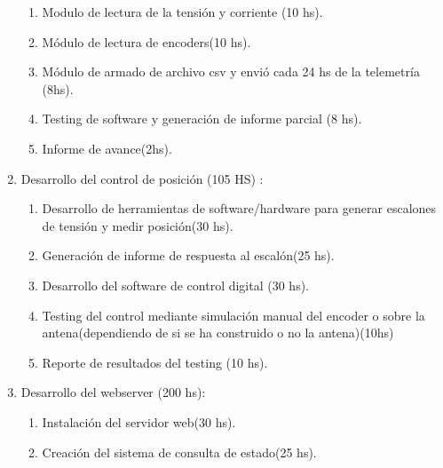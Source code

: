 \documentclass[11pt, %
codirector, %
]{charter}
\begin{document}
\begin{enumerate}
\begin{enumerate}
	\item Modulo de lectura de la tensión y corriente (10 hs). 
	\item Módulo de lectura de encoders(10 hs). 
	\item Módulo de armado de archivo csv y envió cada 24 hs de la telemetría (8hs).
	\item Testing de software y generación de informe parcial (8 hs). 
	\item Informe de avance(2hs). 		
	\end{enumerate}
\item Desarrollo del control de posición (105 HS) :  
	\begin{enumerate}
	\item  Desarrollo de herramientas de software/hardware para generar escalones de tensión y medir posición(30 hs). 
	\item  Generación de informe de respuesta al escalón(25 hs). 
	\item  Desarrollo del software de control digital (30 hs).  
	\item  Testing del control mediante simulación manual del encoder o sobre la antena(dependiendo de si se ha construido o no la antena)(10hs)   
	\item  Reporte de resultados del testing (10 hs). 	
\end{enumerate}
\item Desarrollo del webserver (200 hs):  
	\begin{enumerate}
		\item Instalación del servidor web(30 hs).
		\item Creación del sistema de consulta de estado(25 hs). 
	

\end{enumerate}
\end{enumerate}
\end{document}
